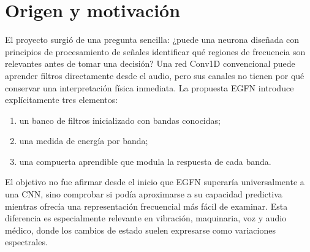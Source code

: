 \documentclass[11pt,a4paper]{article}
\newcommand{\egfn}{EGFN}
\begin{document}
\begin{abstract}
Este proyecto investiga una arquitectura de audio denominada \emph{Energy-Gated
Frequency Neuron} (\egfn). Su hipótesis central es que un banco de filtros,
combinado con medición explícita de energía y compuertas aprendibles, puede
proporcionar un sesgo inductivo útil e interpretable para señales cuyos patrones
discriminativos aparecen en regiones frecuenciales. La investigación evolucionó
desde señales sintéticas controladas hasta voz real y sonidos de maquinaria
industrial. En Google Speech Commands, la variante temporal amplia alcanzó
\(0.886\) de exactitud de prueba frente a \(0.892\) de una Conv1D. En MIMII
Valve obtuvo AUC \(0.984\), comparable y ligeramente superior al \(0.982\) de
la Conv1D. La calibración del umbral elevó el F1 de EGFN de \(0.738\) a
\(0.828\), aunque redujo el recall. Los resultados apoyan el valor del frontend
frecuencial, pero también muestran que los gates actuales no explican por sí
solos las decisiones y que los filtros no restringidos pueden perder su forma
clásica de banda. Se presenta una evaluación honesta de estas fortalezas,
limitaciones y próximos experimentos.
\end{abstract}

\tableofcontents
\newpage

\section{Origen y motivación}

El proyecto surgió de una pregunta sencilla: ¿puede una neurona diseñada con
principios de procesamiento de señales identificar qué regiones de frecuencia
son relevantes antes de tomar una decisión? Una red Conv1D convencional puede
aprender filtros directamente desde el audio, pero sus canales no tienen por
qué conservar una interpretación física inmediata. La propuesta EGFN introduce
explícitamente tres elementos:

\begin{enumerate}
  \item un banco de filtros inicializado con bandas conocidas;
  \item una medida de energía por banda;
  \item una compuerta aprendible que modula la respuesta de cada banda.
\end{enumerate}

El objetivo no fue afirmar desde el inicio que EGFN superaría universalmente a
una CNN, sino comprobar si podía aproximarse a su capacidad predictiva mientras
ofrecía una representación frecuencial más fácil de examinar. Esta diferencia
es especialmente relevante en vibración, maquinaria, voz y audio médico, donde
los cambios de estado suelen expresarse como variaciones espectrales.
\end{document}
